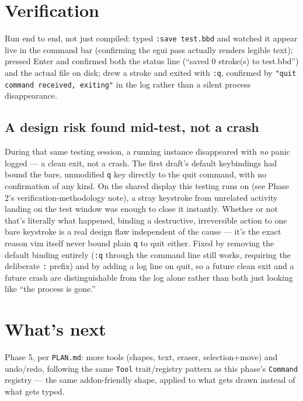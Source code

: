 \documentclass[11pt]{article}
\begin{document}
\section{Verification}
Run end to end, not just compiled: typed \texttt{:save test.bbd} and watched it appear
live in the command bar (confirming the egui pass actually renders legible text); pressed
Enter and confirmed both the status line (``saved 0 stroke(s) to test.bbd'') and the
actual file on disk; drew a stroke and exited with \texttt{:q}, confirmed by
\texttt{"quit command received, exiting"} in the log rather than a silent process
disappearance.

\subsection{A design risk found mid-test, not a crash}
During that same testing session, a running instance disappeared with \emph{no} panic
logged — a clean exit, not a crash. The first draft's default keybindings had bound the
bare, unmodified \texttt{q} key directly to the quit command, with no confirmation of any
kind. On the shared display this testing runs on (see Phase 2's verification-methodology
note), a stray keystroke from unrelated activity landing on the test window was enough to
close it instantly. Whether or not that's literally what happened, binding a destructive,
irreversible action to one bare keystroke is a real design flaw independent of the cause —
it's the exact reason vim itself never bound plain \texttt{q} to quit either. Fixed by
removing the default binding entirely (\texttt{:q} through the command line still works,
requiring the deliberate \texttt{:} prefix) and by adding a log line on quit, so a future
clean exit and a future crash are distinguishable from the log alone rather than both just
looking like ``the process is gone.''

\section{What's next}
Phase 5, per \texttt{PLAN.md}: more tools (shapes, text, eraser, selection+move) and
undo/redo, following the same \texttt{Tool} trait/registry pattern as this phase's
\texttt{Command} registry — the same addon-friendly shape, applied to what gets drawn
instead of what gets typed.
\end{document}
